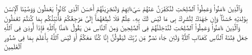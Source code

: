 \stopbuffer
\startbuffer[\q:29:7]
وَٱلَّذِینَ ءَامَنُوا۟ وَعَمِلُوا۟ ٱلصَّٰلِحَٰتِ لَنُكَفِّرَنَّ عَنۡهُمۡ سَیِّءَاتِهِمۡ وَلَنَجۡزِیَنَّهُمۡ أَحۡسَنَ ٱلَّذِی كَانُوا۟ یَعۡمَلُونَ%
\stopbuffer
\startbuffer[\q:29:8]
وَوَصَّیۡنَا ٱلۡإِنسَٰنَ بِوَٰلِدَیۡهِ حُسۡنࣰاۖ وَإِن جَٰهَدَٰكَ لِتُشۡرِكَ بِی مَا لَیۡسَ لَكَ بِهِۦ عِلۡمࣱ فَلَا تُطِعۡهُمَاۤۚ إِلَیَّ مَرۡجِعُكُمۡ فَأُنَبِّئُكُم بِمَا كُنتُمۡ تَعۡمَلُونَ%
\stopbuffer
\startbuffer[\q:29:9]
وَٱلَّذِینَ ءَامَنُوا۟ وَعَمِلُوا۟ ٱلصَّٰلِحَٰتِ لَنُدۡخِلَنَّهُمۡ فِی ٱلصَّٰلِحِینَ%
\stopbuffer
\startbuffer[\q:29:10]
وَمِنَ ٱلنَّاسِ مَن یَقُولُ ءَامَنَّا بِٱللَّهِ فَإِذَاۤ أُوذِیَ فِی ٱللَّهِ جَعَلَ فِتۡنَةَ ٱلنَّاسِ كَعَذَابِ ٱللَّهِۖ وَلَئِن جَاۤءَ نَصۡرࣱ مِّن رَّبِّكَ لَیَقُولُنَّ إِنَّا كُنَّا مَعَكُمۡۚ أَوَ لَیۡسَ ٱللَّهُ بِأَعۡلَمَ بِمَا فِی صُدُورِ ٱلۡعَٰلَمِینَ%
\stopbuffer
